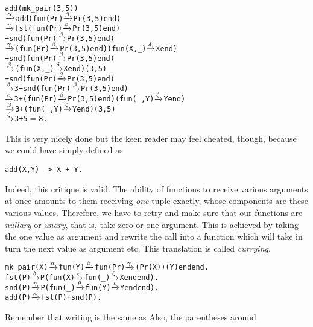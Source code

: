 \begin{alltt}
add(mk_pair(3,5))
         \(\smashedrightarrow{\alpha}\) add(fun(Pr) \(\smashedrightarrow{\beta}\) Pr(3,5) end)
         \(\smashedrightarrow{\eta}\)   fst(fun(Pr) \(\smashedrightarrow{\beta}\) Pr(3,5) end)
            + snd(fun(Pr) \(\smashedrightarrow{\beta}\) Pr(3,5) end)
         \(\smashedrightarrow{\gamma}\)   (fun(Pr) \(\smashedrightarrow{\beta}\) Pr(3,5) end)(fun(X,_) \(\smashedrightarrow{\delta}\) X end)
            + snd(fun(Pr) \(\smashedrightarrow{\beta}\) Pr(3,5) end)
         \(\smashedrightarrow{\beta}\)   (fun(X,_) \(\smashedrightarrow{\delta}\) X end)(3,5)
            + snd(fun(Pr) \(\smashedrightarrow{\beta}\) Pr(3,5) end)
         \(\smashedrightarrow{\delta}\) 3 + snd(fun(Pr) \(\smashedrightarrow{\beta}\) Pr(3,5) end)
         \(\smashedrightarrow{\epsilon}\) 3 + (fun(Pr) \(\smashedrightarrow{\beta}\) Pr(3,5) end)(fun(_,Y) \(\smashedrightarrow{\zeta}\) Y end)
         \(\smashedrightarrow{\beta}\) 3 + (fun(_,Y) \(\smashedrightarrow{\zeta}\) Y end)(3,5)
         \(\smashedrightarrow{\zeta}\) 3 + 5 \(=\) 8.
\end{alltt}
This is very nicely done but the keen reader may feel cheated, though,
because we could have simply defined  as
\begin{verbatim}
add(X,Y) -> X + Y.
\end{verbatim}
Indeed, this critique is valid. The ability of functions to receive
various arguments at once amounts to them receiving \emph{one} tuple
exactly, whose components are these various values. Therefore, we have
to retry and make sure that our functions are \emph{nullary} or
\emph{unary}, that is, take zero or one argument. This is achieved by
taking the one value as argument and rewrite the call into a function
which will take in turn the next value as argument etc. This
translation is called \emph{currying}.
\begin{alltt}
mk_pair(X) \(\smashedrightarrow{\alpha}\) fun(Y) \(\smashedrightarrow{\beta}\) fun(Pr) \(\smashedrightarrow{\gamma}\) (Pr(X))(Y) end end.
fst(P) \(\smashedrightarrow{\delta}\) P(fun(X) \(\smashedrightarrow{\epsilon}\) fun(_) \(\smashedrightarrow{\zeta}\) X end end).
snd(P) \(\smashedrightarrow{\eta}\) P(fun(_) \(\smashedrightarrow{\theta}\) fun(Y) \(\smashedrightarrow{\iota}\) Y end end).
add(P) \(\smashedrightarrow{\kappa}\) fst(P) + snd(P).
\end{alltt}
Remember that writing  is the same as
 Also, the parentheses around
